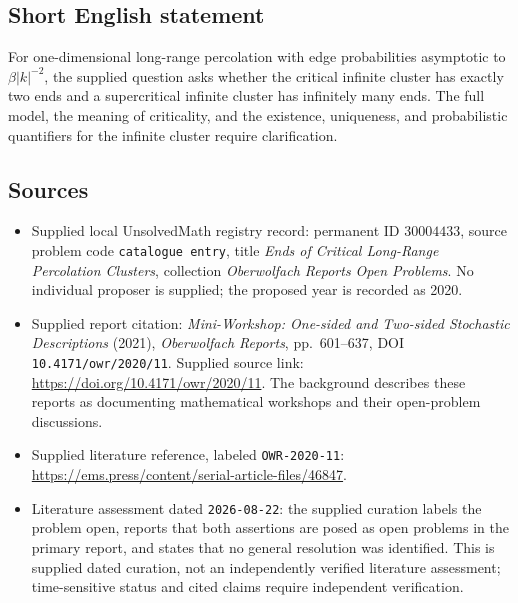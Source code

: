 \documentclass[11pt]{article}
\begin{document}
\subsection{Short English statement}
For one-dimensional long-range percolation with edge probabilities asymptotic to \(\beta |k|^{-2}\), the supplied question asks whether the critical infinite cluster has exactly two ends and a supercritical infinite cluster has infinitely many ends. The full model, the meaning of criticality, and the existence, uniqueness, and probabilistic quantifiers for the infinite cluster require clarification.
\subsection{Sources}
\begin{itemize}
\item Supplied local UnsolvedMath registry record: permanent ID \(30004433\), source problem code \texttt{catalogue entry}, title \emph{Ends of Critical Long-Range Percolation Clusters}, collection \emph{Oberwolfach Reports Open Problems}. No individual proposer is supplied; the proposed year is recorded as 2020.
\item Supplied report citation: \emph{Mini-Workshop: One-sided and Two-sided Stochastic Descriptions} (2021), \emph{Oberwolfach Reports}, pp.\ 601--637, DOI \texttt{10.4171/owr/2020/11}. Supplied source link: \url{https://doi.org/10.4171/owr/2020/11}. The background describes these reports as documenting mathematical workshops and their open-problem discussions.
\item Supplied literature reference, labeled \texttt{OWR-2020-11}: \url{https://ems.press/content/serial-article-files/46847}.
\item Literature assessment dated \texttt{2026-08-22}: the supplied curation labels the problem open, reports that both assertions are posed as open problems in the primary report, and states that no general resolution was identified. This is supplied dated curation, not an independently verified literature assessment; time-sensitive status and cited claims require independent verification.
\end{itemize}
\end{document}
